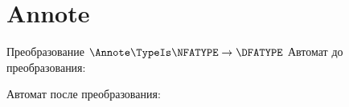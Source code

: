 \section{Annote}
\begin{frame}{Преобразование $\Annote\TypeIs\NFATYPE\to\DFATYPE$}
	Автомат до преобразования:


	Автомат после преобразования:


\end{frame}
